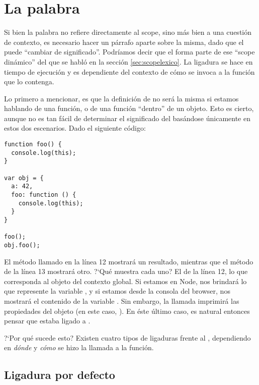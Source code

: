 \section{La palabra }
\label{sec:scopethis}

Si bien la palabra  no refiere directamente al scope, sino más bien a una cuestión de contexto, es necesario hacer un párrafo aparte sobre la misma, dado que el  puede "`cambiar de significado"'. Podríamos decir que el  forma parte de ese "`scope dinámico"' del que se habló en la sección \ref{sec:scopelexico}. La ligadura se hace en tiempo de ejecución y es dependiente del contexto de cómo se invoca a la función que lo contenga.

Lo primero a mencionar, es que la definición de  no será la misma si estamos hablando de una función, o de una función "`dentro"' de un objeto. Esto es cierto, aunque no es tan fácil de determinar el significado del  basándose únicamente en estos dos escenarios. Dado el siguiente código:

\begin{lstlisting}[title={Analizando \code{this}}]
function foo() {
  console.log(this);
}

var obj = {
  a: 42,
  foo: function () {
    console.log(this);
  }
}

foo();
obj.foo();
\end{lstlisting}

El método  llamado en la línea 12 mostrará un resultado, mientras que el método  de la línea 13 mostrará otro. ?`Qué muestra cada uno? El de la línea 12, lo que corresponda al objeto del contexto global. Si estamos en Node, nos brindará lo que represente la variable , y si estamos desde la consola del browser, nos mostrará el contenido de la variable . Sin embargo, la llamada  imprimirá las propiedades del objeto  (en este caso, ). En éste último caso, es natural entonces pensar que  estaba ligado a .

?`Por qué sucede esto? Existen cuatro tipos de ligaduras frente al , dependiendo en \textit{dónde} y \textit{cómo} se hizo la llamada a la función.

\subsection{Ligadura por defecto}

